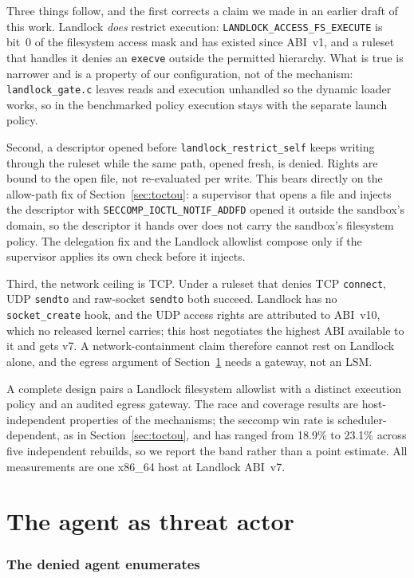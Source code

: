 \documentclass[11pt]{article}
\newcommand{\RaceLo}{18.9}
\newcommand{\RaceHi}{23.1}
\begin{document}
Three things follow, and the first corrects a claim we made in an earlier draft of this work.
Landlock \emph{does} restrict execution: \texttt{LANDLOCK\_ACCESS\_FS\_EXECUTE} is bit~0 of the
filesystem access mask and has existed since ABI~v1, and a ruleset that handles it denies an
\texttt{execve} outside the permitted hierarchy. What is true is narrower and is a property of our
configuration, not of the mechanism: \texttt{landlock\_gate.c} leaves reads and execution unhandled so
the dynamic loader works, so in the benchmarked policy execution stays with the separate launch policy.

Second, a descriptor opened before \texttt{landlock\_restrict\_self} keeps writing through the ruleset
while the same path, opened fresh, is denied. Rights are bound to the open file, not re-evaluated per
write. This bears directly on the allow-path fix of Section~\ref{sec:toctou}: a supervisor that opens
a file and injects the descriptor with \texttt{SECCOMP\_IOCTL\_NOTIF\_ADDFD} opened it outside the
sandbox's domain, so the descriptor it hands over does not carry the sandbox's filesystem policy. The
delegation fix and the Landlock allowlist compose only if the supervisor applies its own check before
it injects.

Third, the network ceiling is TCP. Under a ruleset that denies TCP \texttt{connect}, UDP
\texttt{sendto} and raw-socket \texttt{sendto} both succeed. Landlock has no \texttt{socket\_create}
hook, and the UDP access rights are attributed to ABI~v10, which no released kernel carries; this host
negotiates the highest ABI available to it and gets v7. A network-containment claim therefore cannot
rest on Landlock alone, and the egress argument of Section~\ref{sec:enum} needs a gateway, not an LSM.

A complete design pairs a Landlock filesystem allowlist with a distinct execution policy
and an audited egress gateway. The race and coverage results are host-independent
properties of the mechanisms; the seccomp win rate is scheduler-dependent, as in Section~\ref{sec:toctou},
and has ranged from \RaceLo\% to \RaceHi\% across five independent rebuilds, so we report the band
rather than a point estimate.
All measurements are one x86\_64 host at Landlock ABI~v7.

\part{The agent as threat actor}

\section{The denied agent enumerates}\label{sec:enum}
\end{document}

